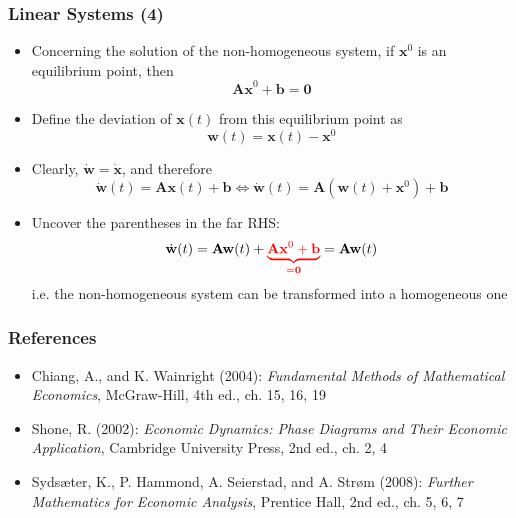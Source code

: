 \documentclass[10pt,usenames,dvipsnames]{beamer}
\theoremstyle{definition}
\begin{document}
\begin{frame}[fragile]
	\frametitle{Linear Systems (4)}
	\begin{itemize}
		\item Concerning the solution of the non-homogeneous system, if $ \mathbf{x}^{0} $ is an equilibrium point, then 
		\[
			\mathbf{Ax}^{0} + \mathbf{b} = \mathbf{0}
		\]
		
		\item Define the deviation of $ \mathbf{x}(t) $ from this equilibrium point as
		\[
			\mathbf{w}(t) = \mathbf{x}(t) - \mathbf{x}^{0}
		\]
		
		\item Clearly, $ \dot{\mathbf{w}} = \dot{\mathbf{x}} $, and therefore
		\[
			\dot{\mathbf{w}}(t) = \mathbf{A}\mathbf{x}(t) + \mathbf{b} \Leftrightarrow \dot{\mathbf{w}}(t) = \mathbf{A}(\mathbf{w}(t) + \mathbf{x}^{0}) + \mathbf{b}
		\]
		
		\item Uncover the parentheses in the far RHS:
		\[
			\dot{\mathbf{w}}(t) = \mathbf{A} \mathbf{w}(t) + \textcolor{red}{\underbrace{\mathbf{A}\mathbf{x}^{0} + \mathbf{b}}_{=\mathbf{0}}} =  \mathbf{A} \mathbf{w}(t)
		\]
		i.e. the non-homogeneous system can be transformed into a homogeneous one
	\end{itemize}
\end{frame}

\begin{frame}[fragile]
\frametitle{References}
\begin{itemize}
	\item Chiang, A., and K. Wainright (2004): \textit{Fundamental Methods of Mathematical Economics}, McGraw-Hill, 4th ed., ch. 15, 16, 19
	\item Shone, R. (2002): \textit{Economic Dynamics: Phase Diagrams and Their Economic Application}, Cambridge University Press, 2nd ed., ch. 2, 4
	\item Syds{\ae}ter, K., P. Hammond, A. Seierstad, and A. Str{\o}m (2008): \textit{Further Mathematics for Economic Analysis}, Prentice Hall, 2nd ed., ch. 5, 6, 7 
\end{itemize}
\end{frame}
\end{document}
